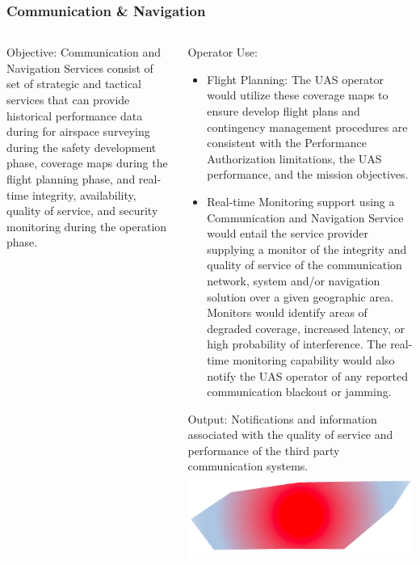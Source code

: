 \documentclass[usenames,dvipsnames,aspectratio=169,serif]{beamer}
\begin{document}
\begin{frame}
   \frametitle{Communication \& Navigation}
   \begin{columns}[t]
      \begin{column}{0.5\textwidth}
         Objective: Communication and Navigation Services consist of set of strategic and tactical services that can provide historical performance data during for airspace surveying during the safety development phase, coverage maps during the flight planning phase, and real-time integrity, availability, quality of service, and security monitoring during the operation phase.
      \end{column}
      \begin{column}{0.5\textwidth}
         Operator Use:
         \begin{itemize}
            \item  Flight Planning: The UAS operator would utilize these coverage maps to ensure develop flight plans and contingency management procedures are consistent with the Performance Authorization limitations, the UAS performance, and the mission objectives.
            \item  Real-time Monitoring support using a Communication and Navigation Service would entail the service provider supplying a monitor of the integrity and quality of service of the communication network, system and/or navigation solution over a given geographic area. Monitors would identify areas of degraded coverage, increased latency, or high probability of interference. The real-time monitoring capability would also notify the UAS operator of any reported communication blackout or jamming.
         \end{itemize}
         Output: Notifications and information associated with the quality of service and performance of the third party communication systems. \\
         \includegraphics[height=0.45\textwidth]{img/flight-notification.png}
      \end{column}
   \end{columns}
\end{frame}
\end{document}
